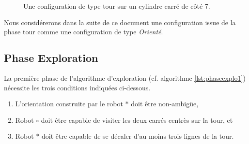 \documentclass{article}
\begin{document}
      \begin{figure}[h]
        \centering
        \caption{Une configuration de type tour sur un cylindre carré de côté 7.}
        \label{fig:orientation}
      \end{figure}

      Nous considérerons dans la suite de ce document une configuration issue de
      la phase tour comme une configuration de type {\it Orienté}.

    \subsection{Phase Exploration}

      La première phase de l'algorithme d'exploration (cf. algorithme
      \ref{lst:phaseexplo1}) nécessite les trois conditions indiquées
      ci-dessous.

      \begin{enumerate}
        \item L'orientation construite par le robot $\ast$ doit être
          non-ambigüe,
        \item Robot $\circ$ doit être capable de visiter les deux carrés centrès
          sur la tour, et
        \item Robot $\ast$ doit être capable de se décaler d'au moins trois
          lignes de la tour.
      \end{enumerate}
\end{document}
